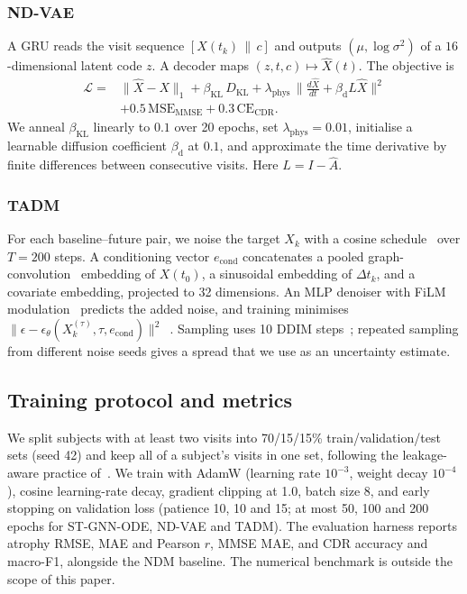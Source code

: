 \documentclass[conference]{IEEEtran}
\begin{document}
\subsubsection{ND-VAE}
A GRU reads the visit sequence $[X(t_k)\,\|\,c]$ and outputs $(\mu,\log\sigma^2)$ of a $16$-dimensional latent code $z$. A decoder maps $(z,t,c)\mapsto\hat X(t)$. The objective is
\begin{equation}
\begin{split}
\mathcal{L}={}&\|\hat X-X\|_1+\beta_{\mathrm{KL}}\,D_{\mathrm{KL}}+\lambda_{\mathrm{phys}}\,\Big\|\tfrac{d\hat X}{dt}+\beta_{\mathrm{d}}L\hat X\Big\|^2\\
&+0.5\,\mathrm{MSE}_{\mathrm{MMSE}}+0.3\,\mathrm{CE}_{\mathrm{CDR}}.
\end{split}
\end{equation}
We anneal $\beta_{\mathrm{KL}}$ linearly to $0.1$ over 20 epochs, set $\lambda_{\mathrm{phys}}=0.01$, initialise a learnable diffusion coefficient $\beta_{\mathrm{d}}$ at $0.1$, and approximate the time derivative by finite differences between consecutive visits. Here $L=I-\hat A$.

\subsubsection{TADM}
For each baseline--future pair, we noise the target $X_k$ with a cosine schedule~\cite{nichol2021improved} over $T=200$ steps. A conditioning vector $e_{\mathrm{cond}}$ concatenates a pooled graph-convolution~\cite{kipf2017gcn} embedding of $X(t_0)$, a sinusoidal embedding of $\Delta t_k$, and a covariate embedding, projected to 32 dimensions. An MLP denoiser with FiLM modulation~\cite{perez2018film} predicts the added noise, and training minimises $\|\epsilon-\epsilon_\theta(X_k^{(\tau)},\tau,e_{\mathrm{cond}})\|^2$~\cite{ho2020ddpm}. Sampling uses 10 DDIM steps~\cite{song2021ddim}; repeated sampling from different noise seeds gives a spread that we use as an uncertainty estimate.

\subsection{Training protocol and metrics}
We split subjects with at least two visits into 70/15/15\% train/validation/test sets (seed 42) and keep all of a subject's visits in one set, following the leakage-aware practice of~\cite{yagis2021leakage}. We train with AdamW (learning rate $10^{-3}$, weight decay $10^{-4}$), cosine learning-rate decay, gradient clipping at 1.0, batch size 8, and early stopping on validation loss (patience 10, 10 and 15; at most 50, 100 and 200 epochs for ST-GNN-ODE, ND-VAE and TADM). The evaluation harness reports atrophy RMSE, MAE and Pearson $r$, MMSE MAE, and CDR accuracy and macro-F1, alongside the NDM baseline. The numerical benchmark is outside the scope of this paper.
\end{document}
